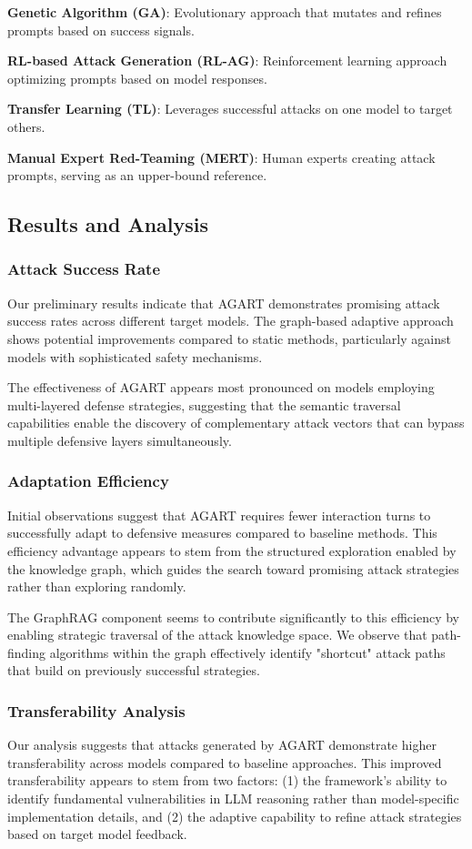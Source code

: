 \textbf{Genetic Algorithm (GA)}: Evolutionary approach that mutates and refines prompts based on success signals.

\textbf{RL-based Attack Generation (RL-AG)}: Reinforcement learning approach optimizing prompts based on model responses.

\textbf{Transfer Learning (TL)}: Leverages successful attacks on one model to target others.

\textbf{Manual Expert Red-Teaming (MERT)}: Human experts creating attack prompts, serving as an upper-bound reference.

\subsection{Results and Analysis}

\subsubsection{Attack Success Rate}
Our preliminary results indicate that AGART demonstrates promising attack success rates across different target models. The graph-based adaptive approach shows potential improvements compared to static methods, particularly against models with sophisticated safety mechanisms. 

The effectiveness of AGART appears most pronounced on models employing multi-layered defense strategies, suggesting that the semantic traversal capabilities enable the discovery of complementary attack vectors that can bypass multiple defensive layers simultaneously.

\subsubsection{Adaptation Efficiency}
Initial observations suggest that AGART requires fewer interaction turns to successfully adapt to defensive measures compared to baseline methods. This efficiency advantage appears to stem from the structured exploration enabled by the knowledge graph, which guides the search toward promising attack strategies rather than exploring randomly.

The GraphRAG component seems to contribute significantly to this efficiency by enabling strategic traversal of the attack knowledge space. We observe that path-finding algorithms within the graph effectively identify "shortcut" attack paths that build on previously successful strategies.

\subsubsection{Transferability Analysis}
Our analysis suggests that attacks generated by AGART demonstrate higher transferability across models compared to baseline approaches. This improved transferability appears to stem from two factors: (1) the framework's ability to identify fundamental vulnerabilities in LLM reasoning rather than model-specific implementation details, and (2) the adaptive capability to refine attack strategies based on target model feedback.

